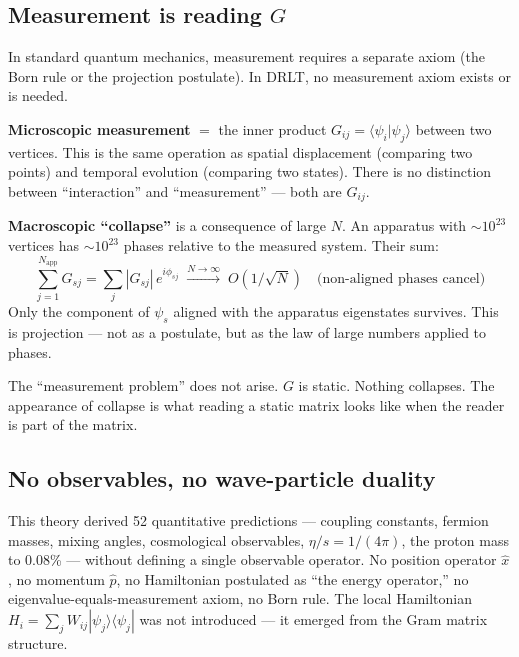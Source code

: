\subsection{Measurement is reading $G$}

In standard quantum mechanics, measurement requires a separate axiom (the Born rule or the projection postulate). In DRLT, no measurement axiom exists or is needed.

\textbf{Microscopic measurement} $=$ the inner product $G_{ij} = \langle\psi_i|\psi_j\rangle$ between two vertices. This is the same operation as spatial displacement (comparing two points) and temporal evolution (comparing two states). There is no distinction between ``interaction'' and ``measurement'' --- both are $G_{ij}$.

\textbf{Macroscopic ``collapse''} is a consequence of large $N$. An apparatus with $\sim\!10^{23}$ vertices has $\sim\!10^{23}$ phases relative to the measured system. Their sum:
\begin{equation}
\sum_{j=1}^{N_\text{app}} G_{sj} = \sum_{j} |G_{sj}|\,e^{i\phi_{sj}} \;\xrightarrow{N \to \infty}\; O(1/\sqrt{N}) \quad\text{(non-aligned phases cancel)}
\end{equation}
Only the component of $\psi_s$ aligned with the apparatus eigenstates survives. This is projection --- not as a postulate, but as the law of large numbers applied to phases.

\begin{remark}
The ``measurement problem'' does not arise. $G$ is static. Nothing collapses. The appearance of collapse is what reading a static matrix looks like when the reader is part of the matrix.
\end{remark}

\subsection{No observables, no wave-particle duality}

This theory derived 52 quantitative predictions --- coupling constants, fermion masses, mixing angles, cosmological observables, $\eta/s = 1/(4\pi)$, the proton mass to 0.08\% --- without defining a single observable operator. No position operator $\hat{x}$, no momentum $\hat{p}$, no Hamiltonian postulated as ``the energy operator,'' no eigenvalue-equals-measurement axiom, no Born rule. The local Hamiltonian $H_i = \sum_j W_{ij}|\psi_j\rangle\langle\psi_j|$ was not introduced --- it emerged from the Gram matrix structure.

